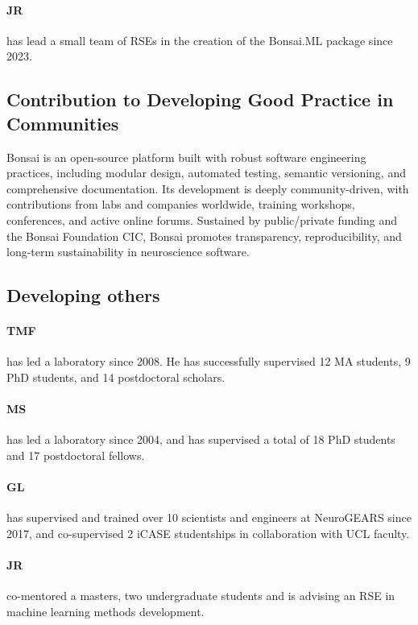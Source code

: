 \paragraph{JR} has lead a small team of RSEs in the
creation of the Bonsai.ML package since 2023.

\subsection{Contribution to Developing Good Practice in Communities}

Bonsai is an open-source platform built with robust software engineering
practices, including modular design, automated testing, semantic versioning,
and comprehensive documentation. Its development is deeply community-driven,
with contributions from labs and companies worldwide, training workshops,
conferences, and active online forums. Sustained by public/private funding and
the Bonsai Foundation CIC, Bonsai promotes transparency, reproducibility, and
long-term sustainability in neuroscience software.  \subsection{Developing
others}

\paragraph{TMF} has led a laboratory since 2008. He has successfully supervised
12 MA students, 9 PhD students, and 14 postdoctoral scholars.

\paragraph{MS} has led a laboratory since 2004, and has supervised a total of 18 PhD students and
17 postdoctoral fellows.

\paragraph{GL} has supervised and trained over 10 scientists and engineers at
NeuroGEARS since 2017, and co-supervised 2 iCASE studentships in collaboration
with UCL faculty.

\paragraph{JR} co-mentored a masters, two undergraduate
students and is advising an RSE in machine learning methods development.
